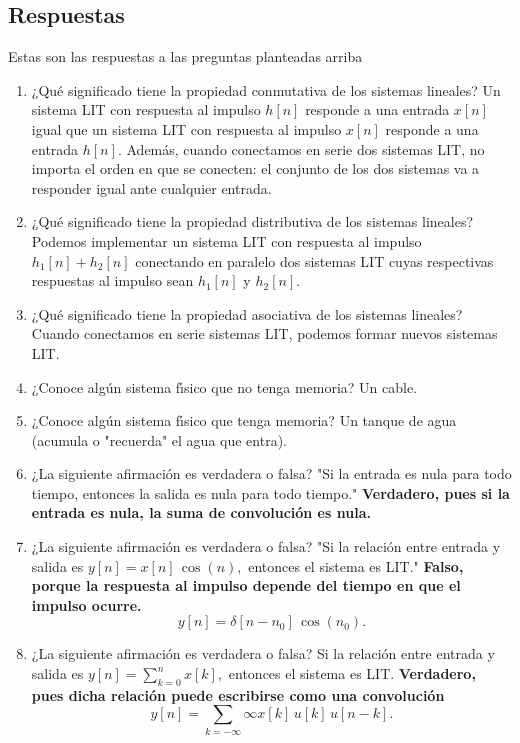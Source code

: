 \subsection{Respuestas}

Estas son las respuestas a las preguntas planteadas arriba

\begin{enumerate}
	\item ¿Qu\'{e} significado tiene la propiedad conmutativa de los sistemas lineales?
	Un sistema LIT con respuesta al impulso $h[n]$ responde a una entrada $x[n]$ igual que un sistema LIT con respuesta al impulso $x[n]$ responde a una entrada $h[n]$. Además, cuando conectamos en serie dos sistemas LIT, no importa el orden en que se conecten: el conjunto de los dos sistemas va a responder igual ante cualquier entrada.
	
	\item ¿Qu\'{e} significado tiene la propiedad distributiva de los sistemas lineales?
	Podemos implementar un sistema LIT con respuesta al impulso $h_{1}[n] + h_{2}[n]$ conectando en paralelo dos sistemas LIT cuyas respectivas respuestas al impulso sean $h_{1}[n]$ y $h_{2}[n]$.
	
	\item ¿Qu\'{e} significado tiene la propiedad asociativa de los sistemas lineales?
	Cuando conectamos en serie sistemas LIT, podemos formar nuevos sistemas LIT.
	
	\item ¿Conoce alg\'{u}n sistema f\'{\i}sico que no tenga memoria? Un cable.
	\item ¿Conoce alg\'{u}n sistema f\'{\i}sico que tenga memoria? Un tanque de agua (acumula o "recuerda" el agua que entra).

    \item  ¿La siguiente afirmación es verdadera o falsa? 
    "Si la entrada es nula para todo tiempo, entonces la salida es nula para todo tiempo."
    \textbf{Verdadero, pues si la entrada es nula, la suma de convoluci\'{o}n es nula.}

   \item  ¿La siguiente afirmación es verdadera o falsa? "Si la relaci\'{o}n entre entrada y salida es 
   $y[n] =x[n] \, \cos \left(n\right) ,$ entonces el sistema  es LIT." 
    \textbf{Falso, porque la respuesta al impulso depende del tiempo en que el impulso ocurre.}
    \begin{equation}
                y[n] = \delta[n - n_{0}] \, \cos \left( n_{0} \right).
    \end{equation}

\item  ¿La siguiente afirmación es verdadera o falsa? Si la relaci\'{o}n entre entrada y salida es 
$y[n] =\sum_{k=0}^{n} x[k] ,$ entonces el sistema es LIT. 
    \textbf{Verdadero, pues dicha relaci\'{o}n puede escribirse como una convoluci\'{o}n} 
        \begin{equation}
                y[n] = \sum_{k=-\infty}{\infty} x[k] \, u[k] \, u[n-k].
        \end{equation}
\end{enumerate}
